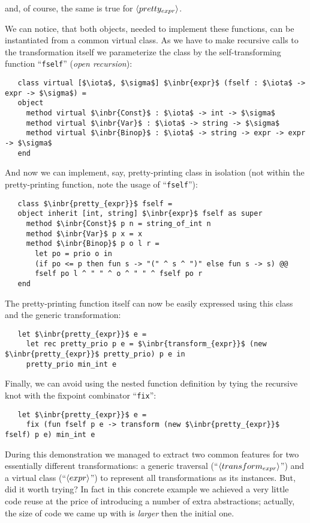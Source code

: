 and, of course, the same is true for $\left<pretty_{expr}\right>$.

We can notice, that both objects, needed to implement these functions, can be instantiated from a common virtual class. As we have to make recursive calls to the transformation
itself we parameterize the class by the self-transforming function ``\lstinline{fself}'' (\emph{open recursion}):

\begin{lstlisting}
   class virtual [$\iota$, $\sigma$] $\inbr{expr}$ (fself : $\iota$ -> expr -> $\sigma$) =
   object
     method virtual $\inbr{Const}$ : $\iota$ -> int -> $\sigma$
     method virtual $\inbr{Var}$ : $\iota$ -> string -> $\sigma$
     method virtual $\inbr{Binop}$ : $\iota$ -> string -> expr -> expr -> $\sigma$  
   end
\end{lstlisting}

And now we can implement, say, pretty-printing class in isolation (not within the pretty-printing function, note the usage of ``\lstinline{fself}''):

\begin{lstlisting}
   class $\inbr{pretty_{expr}}$ fself =
   object inherit [int, string] $\inbr{expr}$ fself as super
     method $\inbr{Const}$ p n = string_of_int n
     method $\inbr{Var}$ p x = x
     method $\inbr{Binop}$ p o l r =
       let po = prio o in
       (if po <= p then fun s -> "(" ^ s ^ ")" else fun s -> s) @@
       fself po l ^ " " ^ o ^ " " ^ fself po r
   end
\end{lstlisting}

The pretty-printing function itself can now be easily expressed using this class and the generic transformation:

\begin{lstlisting}
   let $\inbr{pretty_{expr}}$ e =
     let rec pretty_prio p e = $\inbr{transform_{expr}}$ (new $\inbr{pretty_{expr}}$ pretty_prio) p e in
     pretty_prio min_int e
\end{lstlisting}

Finally, we can avoid using the nested function definition by tying the recursive knot with the fixpoint combinator ``\lstinline{fix}'':

\begin{lstlisting}
   let $\inbr{pretty_{expr}}$ e =
     fix (fun fself p e -> transform (new $\inbr{pretty_{expr}}$ fself) p e) min_int e
\end{lstlisting}

During this demonstration we managed to extract two common features for two essentially different transformations: a generic traversal (``$\left<transform_{expr}\right>$'')
and a virtual class (``$\left<expr\right>$'') to represent all transformations as its instances. But, did it worth trying? In fact in this concrete example we achieved a
very little code reuse at the price of introducing a number of extra abstractions; actually, the size of code we came up with is \emph{larger} then the initial one.

